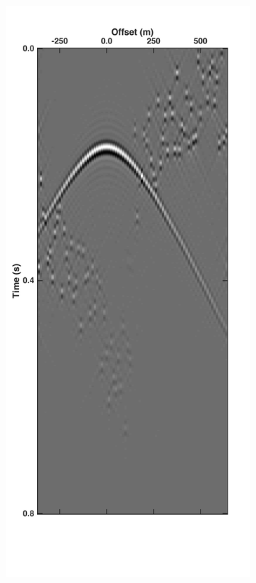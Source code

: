 \begin{figure}
\begin{subfigure}[t]{0.25\textwidth}
		\includegraphics[width=\textwidth]{Plots/Mahdad/5iter/FkFilteredCRG_rec30}	

\end{subfigure}
\end{figure}
